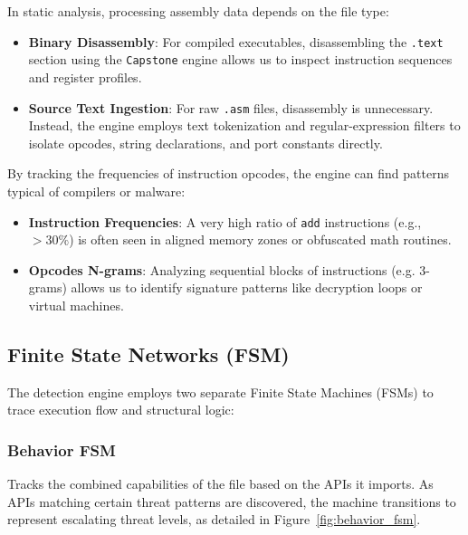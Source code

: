 \documentclass[11pt,a4paper]{article}
\begin{document}
In static analysis, processing assembly data depends on the file type:
\begin{itemize}
    \item \textbf{Binary Disassembly}: For compiled executables, disassembling the \texttt{.text} section using the \texttt{Capstone} engine allows us to inspect instruction sequences and register profiles.
    \item \textbf{Source Text Ingestion}: For raw \texttt{.asm} files, disassembly is unnecessary. Instead, the engine employs text tokenization and regular-expression filters to isolate opcodes, string declarations, and port constants directly.
\end{itemize}

By tracking the frequencies of instruction opcodes, the engine can find patterns typical of compilers or malware:
\begin{itemize}
    \item \textbf{Instruction Frequencies}: A very high ratio of \texttt{add} instructions (e.g., $>30\%$) is often seen in aligned memory zones or obfuscated math routines.
    \item \textbf{Opcodes N-grams}: Analyzing sequential blocks of instructions (e.g. 3-grams) allows us to identify signature patterns like decryption loops or virtual machines.
\end{itemize}

\subsection{Finite State Networks (FSM)}
The detection engine employs two separate Finite State Machines (FSMs) to trace execution flow and structural logic:

\subsubsection{Behavior FSM}
Tracks the combined capabilities of the file based on the APIs it imports. As APIs matching certain threat patterns are discovered, the machine transitions to represent escalating threat levels, as detailed in Figure~\ref{fig:behavior_fsm}.
\end{document}
